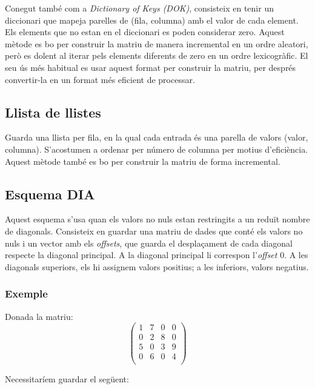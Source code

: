 \documentclass[11pt,a4paper,twoside]{report}
\begin{document}
	 Conegut també com a \textit{Dictionary of Keys (DOK)}, consisteix en tenir un diccionari que mapeja parelles de (fila, columna) amb el valor de cada element. Els elements que no estan en el diccionari es poden considerar zero. 
	 Aquest mètode es bo per construir la matriu de manera incremental en un ordre aleatori, però es dolent al iterar pels elements diferents de zero en un ordre lexicogràfic. El seu ús més habitual es usar aquest format per construir la matriu, per després convertir-la en un format més eficient de processar.
	 
	 \subsection{Llista de llistes}
  
  Guarda una llista per fila, en la qual cada entrada és una parella de valors (valor, columna). S'acostumen a ordenar per número de columna per motius d'eficiència. Aquest mètode també es bo per construir la matriu de forma incremental.
  
  \subsection{Esquema DIA}
  
  Aquest esquema s'usa quan els valors no nuls estan restringits a un reduït nombre de diagonals. Consisteix en guardar una matriu de dades que conté els valors no nuls i un vector amb els \textit{offsets}, que guarda el desplaçament de cada diagonal respecte la diagonal principal.\newline
  A la diagonal principal li correspon l'\textit{offset} 0. A les diagonals superiors, els hi assignem valors positius; a les inferiors, valors negatius.
  
  \subsubsection*{Exemple}
	
	Donada la matriu:
	 \[
	 	\begin{pmatrix}
  		  	1	&	7	& 0	&	0	\\
  		  	0	&	2	&	8	&	0	\\
   		 	5	&	0	&	3	&	9	\\
    		0	&	6	&	0	&	4	\\
    \end{pmatrix} \]
    
    Necessitaríem guardar el següent:
     
\end{document}
